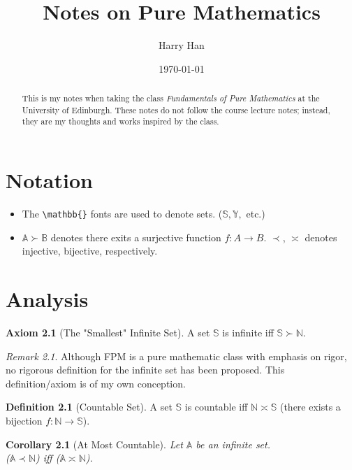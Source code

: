 \documentclass[12pt, a4paper]{report}
\title{Notes on Pure Mathematics}
\author{Harry Han}
\date{\today}
\newtheorem{corollary}{Corollary}[section]
\theoremstyle{definition}
\newtheorem{definition}{Definition}[section]
\theoremstyle{definition}
\newtheorem{axiom}{Axiom}[section]
\theoremstyle{remark}
\newtheorem{remark}{Remark}[section]
\begin{document}
\maketitle
\tableofcontents

\newpage

\begin{abstract}
	This is my notes when taking the class \emph{Fundamentals of Pure Mathematics} at the University of Edinburgh. These notes do not follow the course lecture notes; instead, they are my thoughts and works inspired by the class.
\end{abstract}
\chapter{Notation}

\begin{itemize}
	\item The \verb|\mathbb{}| fonts are used to denote sets. ($\mathbb{S}, \mathbb{Y},$ etc.)
	\item $\mathbb{A} \succ \mathbb{B}$ denotes there exits a surjective function $f:A\rightarrow B$. $\prec$, $\asymp$ denotes injective, bijective, respectively.
\end{itemize}

\chapter{Analysis}
\begin{axiom}[The "Smallest" Infinite Set]
	A set $\mathbb{S}$ is infinite iff $\mathbb{S} \succ \mathbb{N}$. 
\end{axiom}

\begin{remark}
	Although FPM is a pure mathematic class with emphasis on rigor, no rigorous definition for the infinite set has been proposed. This definition/axiom is of my own conception.
\end{remark}

\begin{definition}[Countable Set]
	A set $\mathbb{S}$ is countable iff $\mathbb{N} \asymp \mathbb{S}$ (there exists a bijection $f:\mathbb{N} \rightarrow \mathbb{S}$).
\end{definition}

\begin{corollary}[At Most Countable]
	Let $\mathbb{A}$ be an infinite set. \\($\mathbb{A} \prec \mathbb{N}$) iff ($\mathbb{A} \asymp \mathbb{N}$).
\end{corollary}
\end{document}
